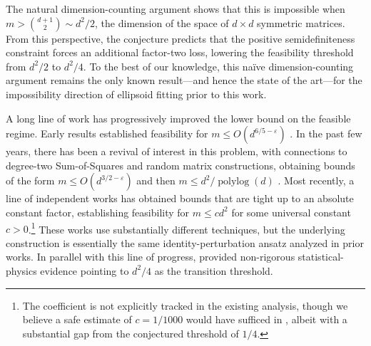 \documentclass[12pt]{article}
\newcommand{\Authornote}[3]{{\sf\footnotesize\color{#3}{[#1: #2]}}}
\newcommand{\Authornote}[3]{}
\newcommand{\jnote}[1]{\Authornote{Jeff}{#1}{blue}}
\newcommand{\snote}[1]{\Authornote{Sofia}{#1}{orange}}
\begin{document}
The natural dimension-counting argument %
shows that this is impossible when $m >  \binom{d+1}{2} \sim d^2/2$, the dimension of the space of $d\times d$ symmetric matrices. From this perspective, the conjecture predicts that the positive semidefiniteness constraint forces an additional factor-two loss, lowering the feasibility threshold from \(d^2/2\) to \(d^2/4\). To the best of our knowledge, this na\"{i}ve dimension-counting argument remains the only known result—and hence the state of the art—for the impossibility direction of ellipsoid fitting prior to this work.


A long line of work has progressively improved the lower bound on the feasible
regime.  Early results established feasibility for
\(m\le O(d^{6/5-\varepsilon})\) \cite{SPW13}. 
In the past few years, there has been a revival of interest in this problem, with connections to degree-two Sum-of-Squares and random matrix constructions,
obtaining bounds of the form \(m\le O(d^{3/2-\varepsilon})\) \cite{GJJPR20} and then
\(m\le d^2/\operatorname{polylog}(d)\) \cite{PTVW22,KD22}. Most recently, a line of independent works \cite{HKPX23,BMMP24,TW25} has obtained bounds that are tight up to an absolute constant factor, establishing feasibility for \(m\le c d^2\) for some universal constant \(c>0\).\footnote{The coefficient is not explicitly tracked in the existing analysis, though we believe a safe estimate of $c=1/1000$ would have sufficed in \cite{HKPX23}, albeit with a substantial gap from the conjectured threshold of $1/4$.} These works use substantially different techniques, but the underlying construction is essentially the same identity-perturbation ansatz analyzed in prior works. In parallel with this line of progress, \cite{MD24, MB25} provided non-rigorous statistical-physics evidence pointing to \(d^2/4\) as the transition threshold.
\end{document}
